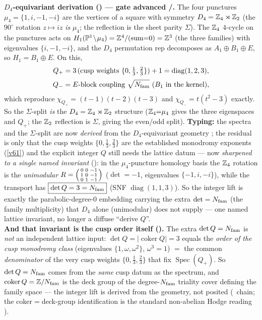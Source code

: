 \begin{keybox}
\smallskip\noindent\textbf{$D_4$-equivariant derivation () --- gate advanced
\mC/\mE.} The four punctures $\mu_4=\{1,i,-1,-i\}$ are the vertices of a square with symmetry
$D_4=\mathbb{Z}_4\rtimes\mathbb{Z}_2$ (the $90^\circ$ rotation $z\!\mapsto\!iz$ \emph{is} $\mu_4$; the reflection is the
sheet parity $\Sigma$). The $\mathbb{Z}_4$ $4$-cycle on the punctures acts on $H_1(\mathbb{P}^1\!\setminus\!\mu_4)=\mathbb{Z}^4/(\text{sum}{=}0)=\mathbb{Z}^3$
(the three families) with eigenvalues $\{i,-1,-i\}$, and the $D_4$ permutation rep decomposes as
$A_1\!\oplus\!B_1\!\oplus\!E$, so $H_1=B_1\oplus E$. On this,
\[
  \begin{gathered}
  Q_+=3\,(\text{cusp weights }\{0,\tfrac13,\tfrac23\})+1=\operatorname{diag}(1,2,3),\\[2pt]
  Q_-=\text{$E$-block coupling }\sqrt{N_{\mathrm{fam}}}\ (B_1\ \text{in the kernel}),
  \end{gathered}
\]
which reproduce $\chi_{Q_+}=(t{-}1)(t{-}2)(t{-}3)$ and $\chi_{Q_-}=t(t^2{-}3)$ exactly. So the $\Sigma$-split
\emph{is} the $D_4=\mathbb{Z}_4\rtimes\mathbb{Z}_2$ structure ($\mathbb{Z}_4{=}\mu_4$ gives the three eigenspaces and $Q_+$; the
$\mathbb{Z}_2$ reflection is $\Sigma$, giving the even/odd split). \textbf{Typing:} the spectra and the
$\Sigma$-split are now \emph{derived} from the $D_4$-equivariant geometry \mE; the residual is only that the
cusp weights $\{0,\tfrac13,\tfrac23\}$ are the established monodromy exponents (\vref{v61}) and the explicit integer
$Q$ still needs the lattice datum --- now \emph{sharpened to a single named invariant}
(): in the $\mu_4$-puncture homology basis the $\mathbb{Z}_4$ rotation is the
\emph{unimodular} $R=\begin{psmallmatrix}0&0&-1\\1&0&-1\\0&1&-1\end{psmallmatrix}$ ($\det{=}{-}1$, eigenvalues
$\{-1,i,-i\}$), while the transport has $\boxed{\det Q=3=N_{\mathrm{fam}}}$ (SNF $\operatorname{diag}(1,1,3)$). So the
integer lift is exactly the parabolic-degree-$0$ embedding carrying the extra $\det=N_{\mathrm{fam}}$ (the family
multiplicity) that $D_4$ alone (unimodular) does not supply --- one named lattice invariant, no longer a
diffuse ``derive $Q$''.
\smallskip\\
\noindent\textbf{And that invariant is the cusp order itself ().} The extra
$\det Q=N_{\mathrm{fam}}$ is \emph{not} an independent lattice input: $\det Q=|\!\operatorname{coker}Q|=3$ equals the
\emph{order of the cusp monodromy class} (eigenvalues $\{1,\omega,\omega^2\}$, $\omega^3{=}1$) $=$ the common
\emph{denominator} of the very cusp weights $\{0,\tfrac13,\tfrac23\}$ that fix $\operatorname{Spec}(Q_+)$. So
$\det Q=N_{\mathrm{fam}}$ comes from the \emph{same} cusp datum as the spectrum, and $\operatorname{coker}Q=\mathbb{Z}/N_{\mathrm{fam}}$ is
the deck group of the degree-$N_{\mathrm{fam}}$ triality cover defining the family space --- the integer lift is derived
from the geometry, not posited (\mE\ chain; the coker$=$deck-group identification is the standard non-abelian
Hodge reading \mE).
\end{keybox}

